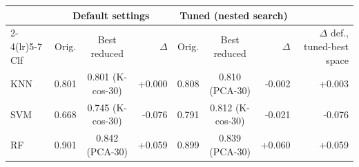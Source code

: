 \begin{tabular}{lccrccrr}
\toprule
 & \multicolumn{3}{c}{Default settings} & \multicolumn{3}{c}{Tuned (nested search)} & \\
\cmidrule(lr){2-4}\cmidrule(lr){5-7}
Clf & Orig. & Best reduced & $\Delta$ & Orig.  & Best reduced  & $\Delta$  & $\Delta$ def., tuned-best space \\
\midrule
KNN & 0.801 & 0.801 (K-cos-30) & +0.000 & 0.808 & 0.810 (PCA-30) & -0.002 & +0.003 \\
SVM & 0.668 & 0.745 (K-cos-30) & -0.076 & 0.791 & 0.812 (K-cos-30) & -0.021 & -0.076 \\
RF & 0.901 & 0.842 (PCA-30) & +0.059 & 0.899 & 0.839 (PCA-30) & +0.060 & +0.059 \\
\bottomrule
\end{tabular}
